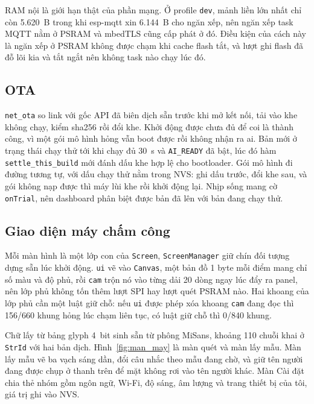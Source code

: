 \documentclass[../DoAn.tex]{subfiles}
\begin{document}
RAM nội là giới hạn thật của phần mạng. Ở profile \texttt{dev}, mảnh liền lớn nhất chỉ còn 5.620~B trong khi
esp-mqtt xin 6.144~B cho ngăn xếp, nên ngăn xếp task MQTT nằm ở PSRAM và mbedTLS cũng cấp phát ở đó. Điều
kiện của cách này là ngăn xếp ở PSRAM không được chạm khi cache flash tắt, và lượt ghi flash đã đỗ lõi kia
và tắt ngắt nên không task nào chạy lúc đó.

\subsection{OTA}
\label{section:4.4.5}

\texttt{net\_ota} so link với gốc API đã biên dịch sẵn trước khi mở kết nối, tải vào khe không chạy, kiểm
sha256 rồi đổi khe. Khởi động được chưa đủ để coi là thành công, vì một gói mô hình hỏng vẫn boot được rồi
không nhận ra ai. Bản mới ở trạng thái chạy thử tới khi chạy đủ 30~s và \texttt{AI\_READY} đã bật, lúc đó
hàm \texttt{settle\_this\_build} mới đánh dấu khe hợp lệ cho bootloader. Gói mô hình đi
đường tương tự, với dấu chạy thử nằm trong NVS: ghi dấu trước, đổi khe sau, và gói không nạp được thì máy
lùi khe rồi khởi động lại. Nhịp sống mang cờ \texttt{onTrial}, nên dashboard phân biệt được bản đã lên với bản
đang chạy thử.

\subsection{Giao diện máy chấm công}
\label{section:4.4.6}

Mỗi màn hình là một lớp con của \texttt{Screen}, \texttt{ScreenManager} giữ chín đối tượng dựng sẵn lúc khởi
động. \texttt{ui} vẽ vào \texttt{Canvas}, một bản đồ 1 byte mỗi điểm mang chỉ số màu và độ phủ, rồi \texttt{cam}
trộn nó vào từng dải 20 dòng ngay lúc đẩy ra panel, nên lớp phủ không tốn thêm lượt SPI hay lượt quét PSRAM
nào. Hai khoang của lớp phủ cần một luật giữ chỗ: nếu \texttt{ui} được phép xóa khoang \texttt{cam} đang đọc thì 156/660 khung hỏng lúc chạm liên tục, có luật giữ chỗ thì 0/840 khung.

Chữ lấy từ bảng glyph 4~bit sinh sẵn từ phông MiSans, khoảng 110 chuỗi khai ở \texttt{StrId} với hai bản dịch.
Hình~\ref{fig:man_may} là màn quét và màn lấy mẫu. Màn lấy mẫu vẽ ba vạch sáng dần, đổi câu nhắc theo mẫu đang
chờ, và giữ tên người đang được chụp ở thanh trên để mặt không rơi vào tên người khác. Màn Cài đặt
chia thẻ nhóm gồm ngôn ngữ, Wi-Fi, độ sáng, âm lượng và trang thiết bị của tôi, giá trị ghi vào NVS.
\end{document}
